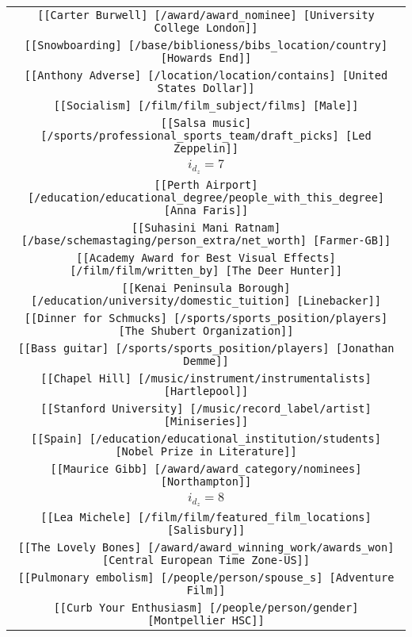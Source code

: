 \begin{longtable}{|c|}
    \texttt{[[Carter Burwell] [/award/award\_nominee] [University College London]]}\\
    \texttt{[[Snowboarding] [/base/biblioness/bibs\_location/country] [Howards End]]}\\
    \texttt{[[Anthony Adverse] [/location/location/contains] [United States Dollar]]}\\
    \texttt{[[Socialism] [/film/film\_subject/films] [Male]]}\\
    \texttt{[[Salsa music] [/sports/professional\_sports\_team/draft\_picks] [Led Zeppelin]]}\\
    \hline 
    \rowcolor[HTML]{EFEFEF} 
    \textsc{$i_{d_z}=7$}\\ \hline 
    \texttt{[[Perth Airport] [/education/educational\_degree/people\_with\_this\_degree] [Anna Faris]]}\\
    \texttt{[[Suhasini Mani Ratnam] [/base/schemastaging/person\_extra/net\_worth] [Farmer-GB]]}\\
    \texttt{[[Academy Award for Best Visual Effects] [/film/film/written\_by] [The Deer Hunter]]}\\
    \texttt{[[Kenai Peninsula Borough] [/education/university/domestic\_tuition] [Linebacker]]}\\
    \texttt{[[Dinner for Schmucks] [/sports/sports\_position/players] [The Shubert Organization]]}\\
    \texttt{[[Bass guitar] [/sports/sports\_position/players] [Jonathan Demme]]}\\
    \texttt{[[Chapel Hill] [/music/instrument/instrumentalists] [Hartlepool]]}\\
    \texttt{[[Stanford University] [/music/record\_label/artist] [Miniseries]]}\\
    \texttt{[[Spain] [/education/educational\_institution/students] [Nobel Prize in Literature]]}\\
    \texttt{[[Maurice Gibb] [/award/award\_category/nominees] [Northampton]]}\\
    \hline 
    \rowcolor[HTML]{EFEFEF} 
    \textsc{$i_{d_z}=8$}\\ \hline 
    \texttt{[[Lea Michele] [/film/film/featured\_film\_locations] [Salisbury]]}\\
    \texttt{[[The Lovely Bones] [/award/award\_winning\_work/awards\_won] [Central European Time Zone-US]]}\\
    \texttt{[[Pulmonary embolism] [/people/person/spouse\_s] [Adventure Film]]}\\
    \texttt{[[Curb Your Enthusiasm] [/people/person/gender] [Montpellier HSC]]}\\

\end{longtable}
